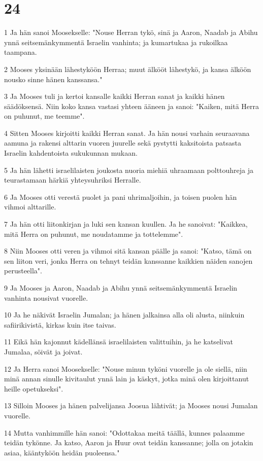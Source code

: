 \chapter{24}

\par 1 Ja hän sanoi Moosekselle: "Nouse Herran tykö, sinä ja Aaron, Naadab ja Abihu ynnä seitsemänkymmentä Israelin vanhinta; ja kumartukaa ja rukoilkaa taampana.
\par 2 Mooses yksinään lähestyköön Herraa; muut älkööt lähestykö, ja kansa älköön nousko sinne hänen kanssansa."
\par 3 Ja Mooses tuli ja kertoi kansalle kaikki Herran sanat ja kaikki hänen säädöksensä. Niin koko kansa vastasi yhteen ääneen ja sanoi: "Kaiken, mitä Herra on puhunut, me teemme".
\par 4 Sitten Mooses kirjoitti kaikki Herran sanat. Ja hän nousi varhain seuraavana aamuna ja rakensi alttarin vuoren juurelle sekä pystytti kaksitoista patsasta Israelin kahdentoista sukukunnan mukaan.
\par 5 Ja hän lähetti israelilaisten joukosta nuoria miehiä uhraamaan polttouhreja ja teurastamaan härkiä yhteysuhriksi Herralle.
\par 6 Ja Mooses otti verestä puolet ja pani uhrimaljoihin, ja toisen puolen hän vihmoi alttarille.
\par 7 Ja hän otti liitonkirjan ja luki sen kansan kuullen. Ja he sanoivat: "Kaikkea, mitä Herra on puhunut, me noudatamme ja tottelemme".
\par 8 Niin Mooses otti veren ja vihmoi sitä kansan päälle ja sanoi: "Katso, tämä on sen liiton veri, jonka Herra on tehnyt teidän kanssanne kaikkien näiden sanojen perusteella".
\par 9 Ja Mooses ja Aaron, Naadab ja Abihu ynnä seitsemänkymmentä Israelin vanhinta nousivat vuorelle.
\par 10 Ja he näkivät Israelin Jumalan; ja hänen jalkainsa alla oli alusta, niinkuin safiirikivistä, kirkas kuin itse taivas.
\par 11 Eikä hän kajonnut kädellänsä israelilaisten valittuihin, ja he katselivat Jumalaa, söivät ja joivat.
\par 12 Ja Herra sanoi Moosekselle: "Nouse minun tyköni vuorelle ja ole siellä, niin minä annan sinulle kivitaulut ynnä lain ja käskyt, jotka minä olen kirjoittanut heille opetukseksi".
\par 13 Silloin Mooses ja hänen palvelijansa Joosua lähtivät; ja Mooses nousi Jumalan vuorelle.
\par 14 Mutta vanhimmille hän sanoi: "Odottakaa meitä täällä, kunnes palaamme teidän tykönne. Ja katso, Aaron ja Huur ovat teidän kanssanne; jolla on jotakin asiaa, kääntyköön heidän puoleensa."

